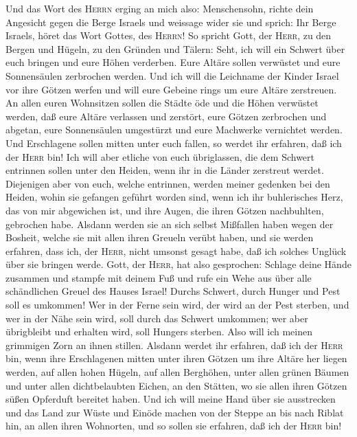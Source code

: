  Und das Wort des \textsc{Herrn} erging an mich also:
 Menschensohn, richte dein Angesicht gegen die Berge
Israels und weissage wider sie und sprich:  Ihr Berge
Israels, höret das Wort Gottes, des \textsc{Herrn}! So spricht Gott, der
\textsc{Herr}, zu den Bergen und Hügeln, zu den Gründen und Tälern:
Seht, ich will ein Schwert über euch bringen und eure Höhen verderben.
 Eure Altäre sollen verwüstet und eure Sonnensäulen
zerbrochen werden.  Und ich will die Leichname der Kinder
Israel vor ihre Götzen werfen und will eure Gebeine rings um eure Altäre
zerstreuen.  An allen euren Wohnsitzen sollen die Städte
öde und die Höhen verwüstet werden, daß eure Altäre verlassen und
zerstört, eure Götzen zerbrochen und abgetan, eure Sonnensäulen
umgestürzt und eure Machwerke vernichtet werden.  Und
Erschlagene sollen mitten unter euch fallen, so werdet ihr erfahren, daß
ich der \textsc{Herr} bin!  Ich will aber etliche von euch
übriglassen, die dem Schwert entrinnen sollen unter den Heiden, wenn ihr
in die Länder zerstreut werdet.  Diejenigen aber von euch,
welche entrinnen, werden meiner gedenken bei den Heiden, wohin sie
gefangen geführt worden sind, wenn ich ihr buhlerisches Herz, das von
mir abgewichen ist, und ihre Augen, die ihren Götzen nachbuhlten,
gebrochen habe. Alsdann werden sie an sich selbst Mißfallen haben wegen
der Bosheit, welche sie mit allen ihren Greueln verübt haben,
 und sie werden erfahren, dass ich, der \textsc{Herr},
nicht umsonst gesagt habe, daß ich solches Unglück über sie bringen
werde.  Gott, der \textsc{Herr}, hat also gesprochen:
Schlage deine Hände zusammen und stampfe mit deinem Fuß und rufe ein
Wehe aus über alle schändlichen Greuel des Hauses Israel! Durchs
Schwert, durch Hunger und Pest soll es umkommen!  Wer in
der Ferne sein wird, der wird an der Pest sterben, und wer in der Nähe
sein wird, soll durch das Schwert umkommen; wer aber übrigbleibt und
erhalten wird, soll Hungers sterben. Also will ich meinen grimmigen Zorn
an ihnen stillen.  Alsdann werdet ihr erfahren, daß ich
der \textsc{Herr} bin, wenn ihre Erschlagenen mitten unter ihren Götzen
um ihre Altäre her liegen werden, auf allen hohen Hügeln, auf allen
Berghöhen, unter allen grünen Bäumen und unter allen dichtbelaubten
Eichen, an den Stätten, wo sie allen ihren Götzen süßen Opferduft
bereitet haben.  Und ich will meine Hand über sie
ausstrecken und das Land zur Wüste und Einöde machen von der Steppe an
bis nach Riblat hin, an allen ihren Wohnorten, und so sollen sie
erfahren, daß ich der \textsc{Herr} bin!

